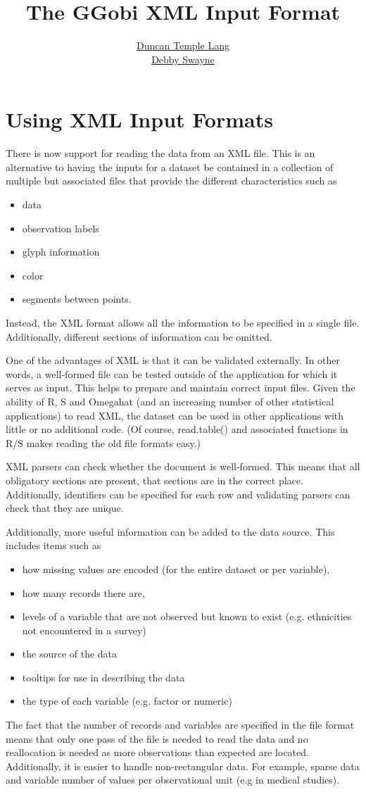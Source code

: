 \documentclass{article}
\title{The GGobi XML Input Format}
\author{\href{http://cm.bell-labs.com/stat/duncan}{Duncan Temple Lang}\\
\href{http://www.research.att.com/~dfs}{Debby Swayne}}
\begin{document}
\maketitle
\section{Using XML Input Formats}
There is now support for reading the data from an XML
file.
This is an alternative to having the inputs
for a dataset be contained in a collection of multiple but associated files
that provide the different characteristics such as 
\begin{itemize}
\item data
\item observation labels
\item glyph information
\item color
\item segments between points.
\end{itemize}
Instead, the XML format allows all the information to be specified in
a single file.  Additionally, different sections of information can be
omitted.


One of the advantages of XML is that it can be validated externally.
In other words, a well-formed file can be tested outside of the
application for which it serves as input.  This helps to prepare and
maintain correct input files.  Given the ability of R, S and Omegahat
(and an increasing number of other statistical applications) to read
XML, the dataset can be used in other applications with little or no
additional code.  (Of course, read.table() and associated functions in
R/S makes reading the old file formats easy.)

XML parsers can check whether the document is well-formed.  This means
that all obligatory sections are present, that sections are in the
correct place.  Additionally, identifiers can be specified for each
row and validating parsers can check that they are unique.

Additionally, more useful information can be added
to the data source.
This includes items such as 
\begin{itemize}
\item how missing values
      are encoded (for the entire dataset or per variable),
\item how many records there are, 
\item levels of a variable that are not observed
      but known to exist (e.g. ethnicities not encountered in a survey)
\item the source of the data
\item tooltips for use in describing the data
\item the type of each variable (e.g. factor or numeric)
\end{itemize}
The fact that the number of records and variables are specified in the
file format means that only one pass of the file is needed to read the
data and no reallocation is needed as more observations than expected
are located.  Additionally, it is easier to handle non-rectangular
data.  For example, sparse data and variable number of values per
observational unit (e.g in medical studies).
\end{document}
